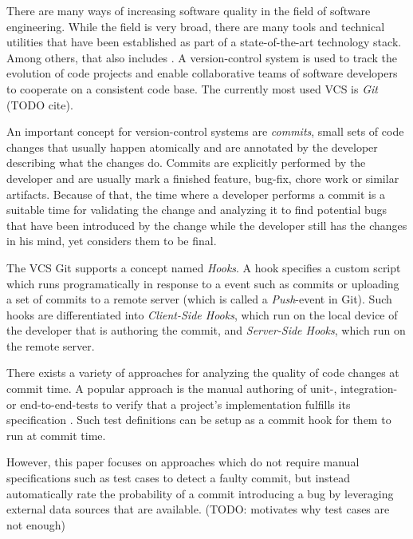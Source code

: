 
There are many ways of increasing software quality in the field of software engineering. While the field is very broad, there are many tools and technical utilities that have been established as part of a state-of-the-art technology stack. Among others, that also includes . A version-control system is used to track the evolution of code projects and enable collaborative teams of software developers to cooperate on a consistent code base. The currently most used VCS is \textit{Git} (TODO cite). \cite{Chacon:2014:PG:2695634}

An important concept for version-control systems are \textit{commits}, small sets of code changes that usually happen atomically and are annotated by the developer describing what the changes do. Commits are explicitly performed by the developer and are usually mark a finished feature, bug-fix, chore work or similar artifacts. Because of that, the time where a developer performs a commit is a suitable time for validating the change and analyzing it to find potential bugs that have been introduced by the change while the developer still has the changes in his mind, yet considers them to be final. %

The VCS Git supports a concept named \textit{Hooks}. A hook specifies a custom script which runs programatically in response to a event such as commits or uploading a set of commits to a remote server (which is called a \textit{Push}-event in Git). Such hooks are differentiated into \textit{Client-Side Hooks}, which run on the local device of the developer that is authoring the commit, and \textit{Server-Side Hooks}, which run on the remote server. \cite{Chacon:2014:PG:2695634}

There exists a variety of approaches for analyzing the quality of code changes at commit time. A popular approach is the manual authoring of unit-, integration- or end-to-end-tests to verify that a project's implementation fulfills its specification \cite{Maayan2018}. Such test definitions can be setup as a commit hook for them to run at commit time.

However, this paper focuses on approaches which do not require manual specifications such as test cases to detect a faulty commit, but instead automatically rate the probability of a commit introducing a bug by leveraging external data sources that are available. (TODO: \cite{Koyuncu2019} motivates why test cases are not enough)

